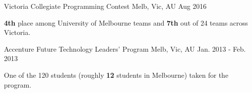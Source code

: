 


\begin{cventries}


\cventry
{}
{Victoria Collegiate Programming Contest} %
{Melb, Vic, AU} %
{Aug 2016} %
{ %
\begin{cvitems}
\item {\textbf{4th} place among University of Melbourne teams and \textbf{7th} out of 24 teams across Victoria.}
\end{cvitems}
}


\cventry
{}
{Accenture Future Technology Leaders’ Program } %
{Melb, Vic, AU} %
{Jan. 2013 - Feb. 2013} %
{ %
\begin{cvitems}
\item {One of the 120 students (roughly \textbf{12} students in Melbourne) taken for the program.}
\end{cvitems}
}

\end{cventries}